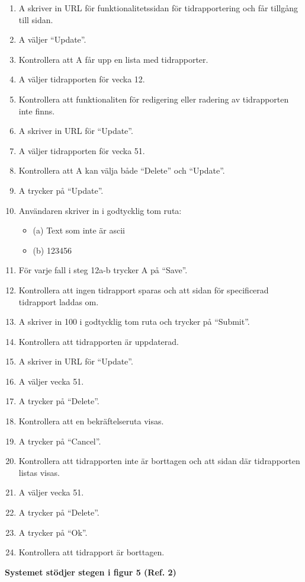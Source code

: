 \documentclass[a4paper]{article}
\begin{document}
\begin{ST}
\begin{enumerate}
\item A skriver in URL för funktionalitetssidan för tidrapportering och får tillgång till sidan.
\item A väljer ``Update''.
\item Kontrollera att A får upp en lista med tidrapporter.
\item A väljer tidrapporten för vecka 12.
\item Kontrollera att funktionaliten för redigering eller radering av tidrapporten inte finns.
\item A skriver in URL för ``Update''.
\item A väljer tidrapporten för vecka 51.
\item Kontrollera att A kan välja både ``Delete'' och ``Update''.
\item A trycker på ``Update''.
\item Användaren skriver in i godtycklig tom ruta:
\begin{itemize}
\item[] (a) Text som inte är ascii
\item[] (b) 123456
\end{itemize}
\item För varje fall i steg 12a-b trycker A på ``Save''. 
\item Kontrollera att ingen tidrapport sparas och att sidan för specificerad tidrapport laddas om.
\item A skriver in 100 i godtycklig tom ruta och trycker på ``Submit''.
\item Kontrollera att tidrapporten är uppdaterad.
\item A skriver in URL för ``Update''.
\item A väljer vecka 51.
\item A trycker på ``Delete''.
\item Kontrollera att en bekräftelseruta visas.
\item A trycker på ``Cancel''.
\item Kontrollera att tidrapporten inte är borttagen och att sidan där tidrapporten listas visas.
\item A väljer vecka 51.
\item A trycker på ``Delete''.
\item A trycker på ``Ok''.
\item Kontrollera att tidrapport är borttagen.
\end{enumerate}

\item
\textbf{Systemet stödjer stegen i figur 5 (Ref. 2)} 


\end{ST}
\end{document}
